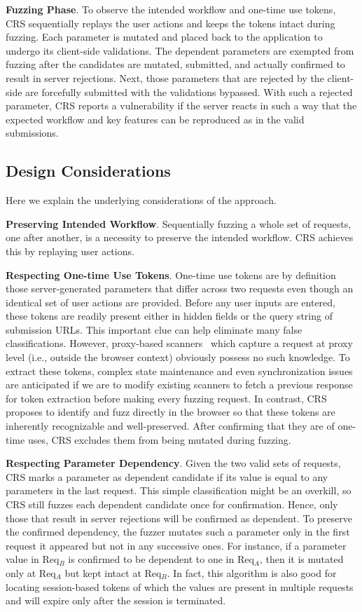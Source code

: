 \documentclass[letter]{sig-alternate-2013}
\begin{document}
\textbf{Fuzzing Phase}. To observe the intended workflow and one-time use tokens, CRS sequentially replays the user actions and keeps the tokens intact during fuzzing. Each parameter is mutated and placed back to the application to undergo its client-side validations. The dependent parameters are exempted from fuzzing after the candidates are mutated, submitted, and actually confirmed to result in server rejections. Next, those parameters that are rejected by the client-side are forcefully submitted with the validations bypassed. With such a rejected parameter, CRS reports a vulnerability if the server reacts in such a way that the expected workflow and key features can be reproduced as in the valid submissions.

\subsection{Design Considerations}
\label{sec:crs_considerations}
Here we explain the underlying considerations of the approach.

\textbf{Preserving Intended Workflow}. Sequentially fuzzing a whole set of requests, one after another, is a necessity to preserve the intended workflow. CRS achieves this by replaying user actions.

\textbf{Respecting One-time Use Tokens}. One-time use tokens are by definition those server-generated parameters that differ across two requests even though an identical set of user actions are provided. Before any user inputs are entered, these tokens are readily present either in hidden fields or the query string of submission URLs. This important clue can help eliminate many false classifications. However, proxy-based scanners~\cite{acunetix,webscarab,tamperdata} which capture a request at proxy level (i.e., outside the browser context) obviously possess no such knowledge. To extract these tokens, complex state maintenance and even synchronization issues are anticipated if we are to modify existing scanners to fetch a previous response for token extraction before making every fuzzing request. In contrast, CRS proposes to identify and fuzz directly in the browser so that these tokens are inherently recognizable and well-preserved. After confirming that they are of one-time uses, CRS excludes them from being mutated during fuzzing.

\textbf{Respecting Parameter Dependency}. Given the two valid sets of requests, CRS marks a parameter as dependent candidate if its value is equal to any parameters in the last request. This simple classification might be an overkill, so CRS still fuzzes each dependent candidate once for confirmation. Hence, only those that result in server rejections will be confirmed as dependent. To preserve the confirmed dependency, the fuzzer mutates such a parameter only in the first request it appeared but not in any successive ones. For instance, if a parameter value in Req$_B$ is confirmed to be dependent to one in Req$_A$, then it is mutated only at Req$_A$ but kept intact at Req$_B$. In fact, this algorithm is also good for locating session-based tokens of which the values are present in multiple requests and will expire only after the session is terminated.
\end{document}
